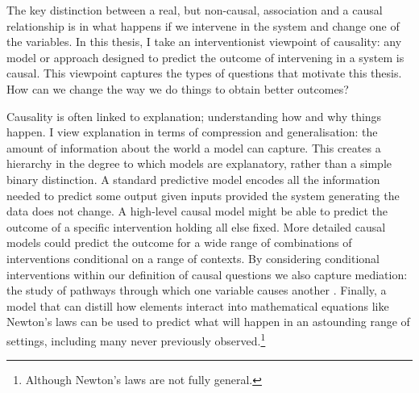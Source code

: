 \documentclass[11pt,a4paper,twoside]{report}
\theoremstyle{plain}
\theoremstyle{definition}
\begin{document}
The key distinction between a real, but non-causal, association and a causal relationship is in what happens if we intervene in the system and change one of the variables. In this thesis, I take an interventionist viewpoint of causality: any model or approach designed to predict the outcome of intervening in a system is causal. This viewpoint captures the types of questions that motivate this thesis. How can we change the way we do things to obtain better outcomes? 

Causality is often linked to explanation; understanding how and why things happen. I view explanation in terms of compression and generalisation: the amount of information about the world a model can capture. This creates a hierarchy in the degree to which models are explanatory, rather than a simple binary distinction. A standard predictive model encodes all the information needed to predict some output given inputs provided the system generating the data does not change. A high-level causal model might be able to predict the outcome of a specific intervention holding all else fixed. More detailed causal models could predict the outcome for a wide range of combinations of interventions conditional on a range of contexts. By considering conditional interventions within our definition of causal questions we also capture mediation: the study of pathways through which one variable causes another \cite{vanderweele2015explanation}. Finally, a model that can distill how elements interact into mathematical equations like Newton's laws can be used to predict what will happen in an astounding range of settings, including many never previously observed.\footnote{Although Newton's laws are not fully general.}
\end{document}
